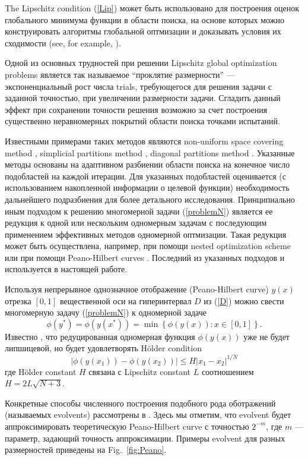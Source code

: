 \documentclass[mathematics,article,submit,pdftex,moreauthors]{Definitions/mdpi}
\begin{document}
The Lipschitz condition (\ref{Lip}) может быть использовано для построения оценок глобального минимума функции в области поиска, на основе которых можно конструировать алгоритмы глобальной оптмизации и доказывать условия их сходимости (see, for example, \cite{Strongin2000}).

Одной из основных трудностей при решении Lipschitz global optimization problems является так называемое ``проклятие размерности'' --- экспоненциальный рост числа trials, требующегося для решения задачи с заданной точностью, при увеличении размерности задачи. Сгладить данный эффект при сохранении точности решения возможно за счет построения существенно неравномерных покрытий области поиска точками испытаний.

Известными примерами таких методов являются non-uniform space covering method \cite{Evtushenko2013}, simplicial partitions method \cite{PaulaviciusZilinskas2014}, diagonal partitions method \cite{Sergeyev2017}. Указанные методы основаны на адаптивном разбиении области поиска на конечное число подобластей на каждой итерации.
Для указанных подобластей оценивается (с использованием накопленной информации о целевой функции) необходимость дальнейшего подразбиения для более детального исследования. 
 Принципиально иным подходом к решению многомерной задачи (\ref{problemN}) является ее редукция к одной или нескольким одномерным задачам с последующим применением эффективных методов одномерной оптмизации. Такая редукция может быть осуществлена, например, при помощи nested optimization scheme \cite{Grishagin2018} или при помощи Peano-Hilbert curves \cite{Barkalov2018}. Последний из указанных подходов и используется в настоящей работе.

Используя непрерывное однозначное отображение (Peano-Hilbert curve) $y(x)$ отрезка $[0,1]$ вещественной оси на гиперинтервал $D$ из (\ref{D}) можно свести многомерную задачу (\ref{problemN}) к одномерной задаче
\[
\phi(y^\ast)=\phi(y(x^\ast))=\min{\left\{\phi(y(x)): x\in[0,1]\right\}}.
\]
Известно \cite{Strongin2000,Sergeyev2013}, что редуцированная одномерная функция $\phi(y(x))$ уже не будет липшицевой, но будет удовлетворять H{\"o}lder condition
\[
\left|\phi(y(x_1))-\phi(y(x_2))\right|\leq H\left|x_1-x_2\right|^{1/N}
\]
где H{\"o}lder constant $H$ связана с Lipschitz constant $L$ соотношением $ H=2 L \sqrt{N+3}$.

Конкретные способы численного построения подобного рода оботражений (называемых evolvents) рассмотрены в \cite{Strongin2000,Sergeyev2013}.
Здесь мы отметим, что evolvent будет аппроксимировать теоретическую Peano-Hilbert curve с точностью $2^{-m}$, где $m$ --- параметр, задающий точность аппроксимации. Примеры evolvent для разных размерностей приведены на Fig.~\ref{fig:Peano}.
\end{document}
